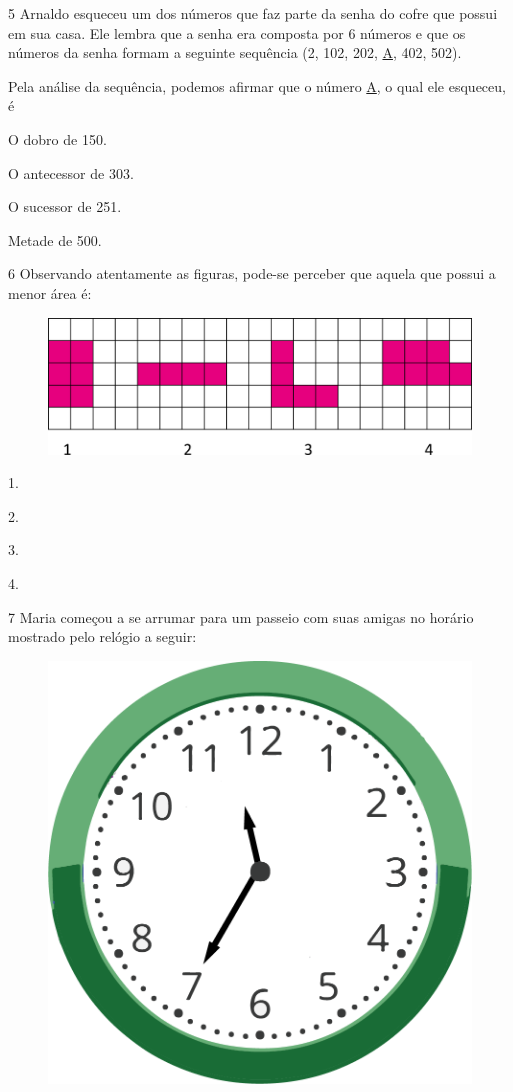 \num{5} Arnaldo esqueceu um dos números que faz parte da senha do cofre que
possui em sua casa. Ele lembra que a senha era composta por 6 números e
que os números da senha formam a seguinte sequência (2, 102, 202,
\underline{A}, 402, 502).

Pela análise da sequência, podemos afirmar que o número \underline{A}, o qual ele esqueceu, é

\begin{multicols}{2}
\begin{escolha}
\item
  O dobro de 150.
\item
  O antecessor de 303.
\item
  O sucessor de 251.
\item
  Metade de 500.
\end{escolha}
\end{multicols}

\pagebreak
\num{6} Observando atentamente as figuras, pode-se perceber que aquela que possui a menor área é:

\begin{figure}[htpb!]
\centering
\includegraphics[width=\textwidth]{./media/image115.png}
\end{figure}

\begin{escolha}
\item
  1.
\item
  2.
\item
  3.
\item
  4.
\end{escolha}


\num{7} Maria começou a se arrumar para um passeio com suas amigas no horário mostrado pelo relógio a seguir:

\begin{figure}[htpb!]
\centering
\includegraphics[width=.5\textwidth]{./media/image116.png}
\end{figure}

